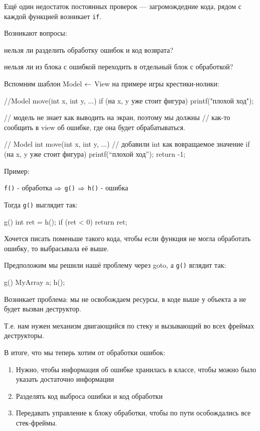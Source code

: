 Ещё один недостаток постоянных проверок --- загромождедние кода, рядом с каждой функцией возникает \texttt{if}.

Возникают вопросы:

нельзя ли разделить обработку ошибок и код возврата?

нельзя ли из блока с ошибкой переходить в отдельный блок с обработкой?

Вспомним шаблон Model $\leftarrow$ View на примере игры крестики-нолики:

\begin{cppcode}
//Model
move(int x, int y, ...) {
     if (на x, y уже стоит фигура) {
         printf("плохой ход");
     }
}

// модель не знает как выводить на экран, поэтому мы должны
// как-то сообщить в view об ошибке, где она будет обрабатываться.

// Model
int move(int x, int y, ...) {    // добавили int как вовращаемое значение
     if (на x, y уже стоит фигура) {
          printf(“плохой ход”);
          return -1;
     }
}
\end{cppcode}

Пример:

\texttt{f()} - обработка $\Rightarrow$ \texttt{g()} $\Rightarrow$ \texttt{h()} - ошибка

Тогда \texttt{g()} выглядит так:

\begin{cppcode}
g() {
     int ret = h();
     if (ret < 0)
          return ret;
}
\end{cppcode}

Хочется писать поменьше такого кода, чтобы если функция не могла обработать ошибку, то выбрасывала её выше.

Предположим мы решили нашё проблему через goto, а \texttt{g()} вглядит так:

\begin{cppcode}
g() {
    MyArray a;
    h();
}
\end{cppcode}

Возникает проблема: мы не освобождаем ресурсы, в коде выше у объекта \texttt{a} не будет вызван деструктор.

Т.е. нам нужен механизм двигающийся по стеку и вызывающий во всех фреймах деструкторы.


В итоге, что мы теперь хотим от обработки ошибок:
\begin{enumerate}
	\item Нужно, чтобы информация об ошибке хранилась в классе, чтобы можно было указать достаточно информации
	\item Разделять код выброса ошибки и код обработки
	\item Передавать управление к блоку обработки, чтобы по пути особождались все стек-фреймы.
\end{enumerate}

